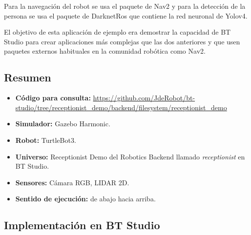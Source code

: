 Para la navegación del robot se usa el paquete de Nav2 y para la detección de la persona se usa el paquete de DarknetRos que contiene la red neuronal de Yolov4.

El objetivo de esta aplicación de ejemplo era demostrar la capacidad de BT Studio para crear aplicaciones más complejas que las dos anteriores y que usen paquetes externos habituales en la comunidad
robótica como Nav2.

\subsection{Resumen}

\begin{itemize}
    \item \textbf{Código para consulta:} \url{https://github.com/JdeRobot/bt-studio/tree/receptionist_demo/backend/filesystem/receptionist_demo}
    \item \textbf{Simulador:} Gazebo Harmonic.
    \item \textbf{Robot:} TurtleBot3.
    \item \textbf{Universo:} Receptionist Demo del Robotics Backend llamado \textit{receptionist} en BT Studio.
    \item \textbf{Sensores:} Cámara RGB, LIDAR 2D.
    \item \textbf{Sentido de ejecución:} de abajo hacia arriba. 
\end{itemize}

\subsection{Implementación en BT Studio}

